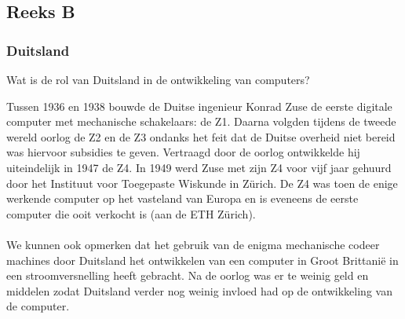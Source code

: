 \documentclass[../main.tex]{subfiles}
\begin{document}
\subsection{Reeks B}
\subsubsection{Duitsland}
\begin{question}
Wat is de rol van Duitsland in de ontwikkeling van computers?
\end{question}
\begin{solution}
Tussen 1936 en 1938 bouwde de Duitse ingenieur Konrad Zuse de eerste digitale computer met mechanische schakelaars: de Z1.
Daarna volgden tijdens de tweede wereld oorlog de Z2 en de Z3 ondanks het feit dat de Duitse overheid niet bereid was hiervoor subsidies te geven.
Vertraagd door de oorlog ontwikkelde hij uiteindelijk in 1947 de Z4. In 1949 werd Zuse met zijn Z4 voor vijf jaar gehuurd door het Instituut voor Toegepaste Wiskunde in Z\"urich.
De Z4 was toen de enige werkende computer op het vasteland van Europa en is eveneens de eerste computer die ooit verkocht is (aan de ETH Z\"urich).
\\\\
We kunnen ook opmerken dat het gebruik van de enigma mechanische codeer machines door Duitsland het ontwikkelen van een computer in Groot Brittani\"e in een stroomversnelling heeft gebracht. Na de oorlog was er te weinig geld en middelen zodat Duitsland verder nog weinig invloed had op de ontwikkeling van de computer.
\end{solution}
\end{document}
